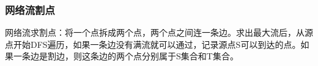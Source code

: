\subsubsection{网络流割点}
网络流求割点：将一个点拆成两个点，两个点之间连一条边。求出最大流后，从源点开始DFS遍历，如果一条边没有满流就可以通过，记录源点S可以到达的点。如果一条边是割边，则这条边的两个点分别属于S集合和T集合。
